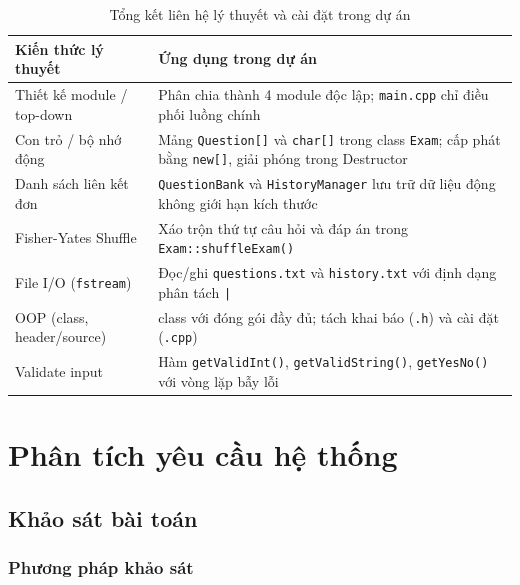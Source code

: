 \documentclass[11pt]{report}
\begin{document}
\begin{table}[H]
    \centering
    \begin{tabularx}{\textwidth}{|l|>{\raggedright\arraybackslash}X|} \hline
        \textbf{Kiến thức lý thuyết} & \textbf{Ứng dụng trong dự án} \\ \hline
        Thiết kế module / top-down & Phân chia thành 4 module độc lập; \texttt{main.cpp} chỉ điều phối luồng chính \\ \hline
        Con trỏ / bộ nhớ động & Mảng \texttt{Question[]} và \texttt{char[]} trong class \texttt{Exam}; cấp phát bằng \texttt{new[]}, giải phóng trong Destructor \\ \hline
        Danh sách liên kết đơn & \texttt{QuestionBank} và \texttt{HistoryManager} lưu trữ dữ liệu động không giới hạn kích thước \\ \hline
        Fisher-Yates Shuffle & Xáo trộn thứ tự câu hỏi và đáp án trong \texttt{Exam::shuffleExam()} \\ \hline
        File I/O (\texttt{fstream}) & Đọc/ghi \texttt{questions.txt} và \texttt{history.txt} với định dạng phân tách \texttt{|} \\ \hline
        OOP (class, header/source) & 3 class với đóng gói đầy đủ; tách khai báo (\texttt{.h}) và cài đặt (\texttt{.cpp}) \\ \hline
        Validate input & Hàm \texttt{getValidInt()}, \texttt{getValidString()}, \texttt{getYesNo()} với vòng lặp bẫy lỗi \\ \hline
    \end{tabularx}
    \caption{Tổng kết liên hệ lý thuyết và cài đặt trong dự án}
    \label{tab:theory_summary}
\end{table}

\chapter{Phân tích yêu cầu hệ thống}
\label{chap:phantich}

\section{Khảo sát bài toán}
\label{sec:khaosat}

\subsection{Phương pháp khảo sát}
\end{document}
